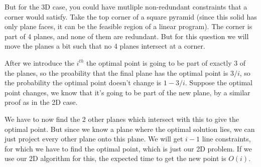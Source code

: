 \documentclass[12pt]{report}
\begin{document}
\begin{enumerate}[label=\textbf{\arabic*.}]
    But for the 3D case, you could have mutliple non-redundant constraints that a corner would satisfy. Take the top corner of a square 
    pyramid (since this solid has only plane faces, it can be the feasible region of a linear program). The corner is part of 4 planes, 
    and none of them are redundant. But for this question we will move the planes a bit such that no 4 planes intersect at a corner.

    After we introduce the $i^{th}$ the optimal point is going to be part of exactly 3 of the planes, so the proability that the final
    plane has the optimal point is $3/i$, so the probability the optimal point doesn't change is $1 - 3/i$. Suppose the optimal point 
    changes, we know that it's going to be part of the new plane, by a similar proof as in the 2D case.

    We have to now find the 2 other planes which intersect with this to give the optimal point. But since we know a plane where the
    optimal solution lies, we can just project every other plane onto this plane. We will get $i-1$ line constraints, for which we 
    have to find the optimal point, which is just our 2D problem. If we use our 2D algorithm for this, the expected time to get the 
    new point is $O(i)$.

\end{enumerate}
\end{document}
